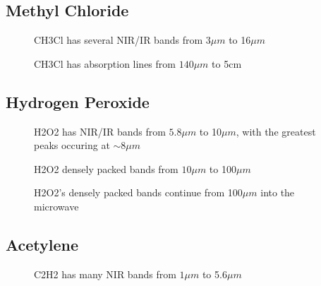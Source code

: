 \documentclass[12pt]{article}
\begin{document}
\subsection{Methyl Chloride}

\vspace*{11.5cm}
\begin{figure}[htb]
\caption{CH3Cl has several NIR/IR bands from $3\mu m$
to  16$\mu m$}
\end{figure}
\newpage


\vspace*{11.5cm}
\begin{figure}[htb]
\caption{CH3Cl has absorption lines from $140\mu m$
to  5cm}
\end{figure}
\newpage

\subsection{Hydrogen Peroxide}

\vspace*{11.5cm}
\begin{figure}[htb]
\caption{H2O2 has NIR/IR bands from $5.8\mu m$
to  10$\mu m$, with the greatest peaks occuring at $\sim 8\mu m$}
\end{figure}
\newpage


\vspace*{11.5cm}
\begin{figure}[htb]
\caption{H2O2 densely packed bands from $10\mu m$
to  100$\mu m$}
\end{figure}
\newpage


\vspace*{11.5cm}
\begin{figure}[htb]
\caption{H2O2's densely packed bands continue from
100$\mu m$ into the microwave}
\end{figure}
\newpage


\subsection{Acetylene}

\vspace*{11.5cm}
\begin{figure}[htb]
\caption{C2H2 has many NIR  bands from $1\mu m$
to 5.6$\mu m$}
\end{figure}
\newpage
\end{document}
